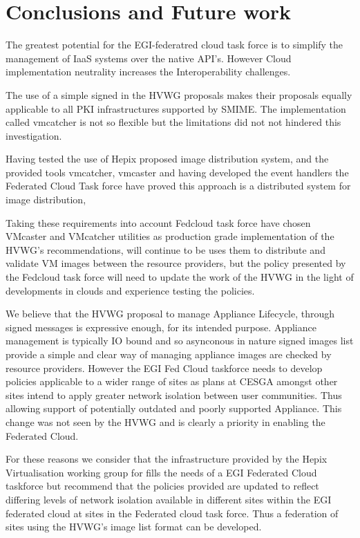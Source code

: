 \documentclass{llncs_Ibergrid2013}
\begin{document}
\section{Conclusions and Future work}
\label{sect-conclusions}
The greatest potential for the EGI-federatred cloud task force is to simplify the management of IaaS systems over the native API's. However Cloud implementation neutrality increases the Interoperability challenges. 

The use of a simple signed in the HVWG proposals makes their proposals equally applicable to all PKI infrastructures supported by SMIME. The implementation called vmcatcher is not so flexible but the limitations did not not hindered this investigation.

Having tested the use of Hepix proposed image distribution system, and the provided tools vmcatcher, vmcaster and having developed the event handlers the Federated Cloud Task force have proved this approach is a distributed system for image distribution, 

Taking these requirements into account Fedcloud task force have chosen VMcaster and VMcatcher utilities as production grade implementation of the HVWG's recommendations, will continue to be uses them to distribute and validate VM images between the resource providers, but the policy presented by the Fedcloud task force will need to update the work of the HVWG in the light of developments in clouds and experience testing the policies.

We believe that the HVWG proposal to manage Appliance Lifecycle, through signed messages is expressive enough, for its intended purpose. Appliance management is typically IO bound and so asynconous in nature signed images list provide a simple and clear way of managing appliance images are checked by resource providers. However the EGI Fed Cloud taskforce needs to develop policies applicable to a wider range of sites as plans at CESGA amongst other sites intend to apply greater network isolation between user communities. Thus allowing support of potentially outdated and poorly supported Appliance. This change was not seen by the HVWG and is clearly a priority in enabling the Federated Cloud.

For these reasons we consider that the infrastructure provided by the Hepix Virtualisation working group for fills the needs of a EGI Federated Cloud taskforce but recommend that the policies provided are updated to reflect differing levels of network isolation available in different sites within the EGI federated cloud at sites in the Federated cloud task force. Thus a federation of sites using the HVWG's image list format can be developed.
\end{document}
